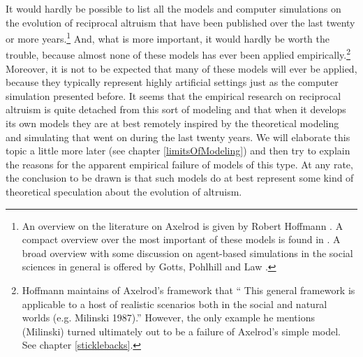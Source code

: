 It would hardly be possible to list all the models and computer simulations on
the evolution of reciprocal altruism that have been published over the last
twenty or more years.\footnote{An overview on the literature on Axelrod is given by Robert Hoffmann \cite[]{hoffmann:2000}. A compact overview over the most important of these models is found in \cite[]{dugatkin:1997}. A broad overview with some discussion on agent-based simulations in the social sciences in general is offered by Gotts, Pohlhill and Law \cite[]{gotts-polhill-law:2003}.} And, what is more important, it would hardly be worth the trouble, because almost none of these models has ever been applied
empirically.\footnote{Hoffmann maintains of Axelrod's framework that 
`` This general framework is applicable to a host of realistic scenarios both in the social and natural worlds (e.g. Milinski 1987).''\cite[section 4.3]{hoffmann:2000} However, the only example he mentions (Milinski) turned ultimately out to be a failure of Axelrod's simple model. See chapter \ref{sticklebacks}.} Moreover, it is not to be expected that many of these models will ever be applied, because they typically represent highly artificial settings just as the computer simulation presented before. It seems that the empirical research on reciprocal altruism is quite detached from this sort of
modeling and that when it develops its own models they are at best remotely
inspired by the theoretical modeling and simulating that went on during the
last twenty years. We will elaborate this topic a little more later (see
chapter \ref{limitsOfModeling}) and then try to explain the reasons for the
apparent empirical failure of models of this type. At any rate, the conclusion
to be drawn is that such models do at best represent some kind of theoretical
speculation about the evolution of altruism.

